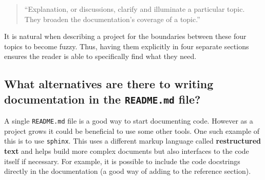 \begin{quote}
``Explanation, or discussions, clarify and illuminate a particular topic. They
broaden the documentation’s coverage of a topic.''
\end{quote}


It is natural when describing a project for the boundaries between these four
topics to become fuzzy. Thus, having them explicitly in four separate sections
ensures the reader is able to specifically find what they need.

\subsection{What alternatives are there to writing documentation in the \texttt{README.md} file?}

A single \texttt{README.md} file is a good way to start documenting code. However as a
project grows it could be beneficial to use some other tools. One such example
of this is to use \texttt{sphinx}. This uses a
different markup language called \textbf{restructured text}
 and helps build more complex
documents but also interfaces to the code itself if necessary. For example, it
is possible to include the code docstrings directly in the documentation (a good
way of adding to the reference section).
